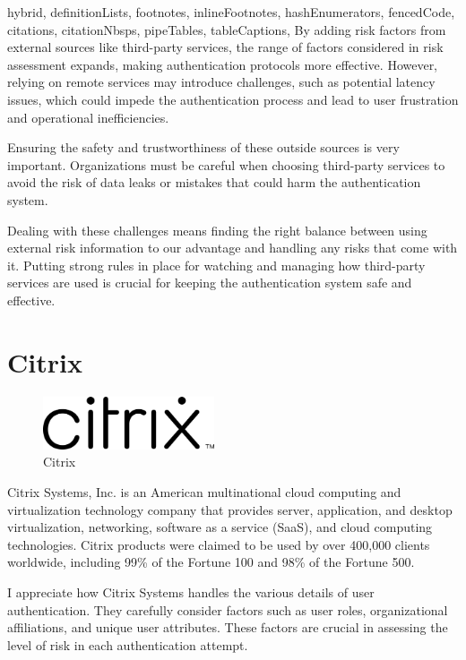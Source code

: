 \documentclass[
  digital,     %
  oneside,     %
  nosansbold,  %
  nocolorbold, %
  lof,         %
  lot,         %
]{fithesis4}
\begin{document}
\begin{markdown*}{%
  hybrid,
  definitionLists,
  footnotes,
  inlineFootnotes,
  hashEnumerators,
  fencedCode,
  citations,
  citationNbsps,
  pipeTables,
  tableCaptions,
}
By adding risk factors from external sources like third-party services, the range of factors considered in risk assessment expands, making authentication protocols more effective.
However, relying on remote services may introduce challenges, such as potential latency issues, which could impede the authentication process and lead to user frustration and operational inefficiencies.

Ensuring the safety and trustworthiness of these outside sources is very important.
Organizations must be careful when choosing third-party services to avoid the risk of data leaks or mistakes that could harm the authentication system.

Dealing with these challenges means finding the right balance between using external risk information to our advantage and handling any risks that come with it.
Putting strong rules in place for watching and managing how third-party services are used is crucial for keeping the authentication system safe and effective. \cite{existing-okta-lowrisk} \cite{existing-okta-confidence}

\newpage
\section{Citrix}

\begin{figure}[htbp]
  \centering
  \includegraphics[width=0.45\textwidth]{img/citrix.png}
  \caption{Citrix}
  \label{fig:citrix-logo}
\end{figure}

Citrix Systems, Inc. is an American multinational cloud computing and virtualization technology company that provides server, application, and desktop virtualization, networking, software as a service (SaaS), and cloud computing technologies.
Citrix products were claimed to be used by over 400,000 clients worldwide, including 99\% of the Fortune 100 and 98\% of the Fortune 500.

I appreciate how Citrix Systems handles the various details of user authentication.
They carefully consider factors such as user roles, organizational affiliations, and unique user attributes.
These factors are crucial in assessing the level of risk in each authentication attempt.


\end{markdown*}
\end{document}
